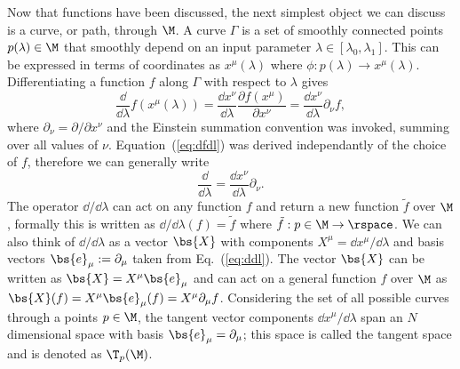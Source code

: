 Now that functions have been discussed, the next simplest object we can discuss is a curve, or path, through $\M$. A curve $\Gamma$ is a set of smoothly connected points $p(\lambda)\in \M$ that smoothly depend on an input parameter $\lambda \in [\lambda_0,\lambda_1]$. This can be expressed in terms of coordinates as $x^\mu(\lambda)$ where $\phi:p(\lambda) \rightarrow x^\mu(\lambda)$. Differentiating a function $f$ along $\Gamma$ with respect to $\lambda$ gives
\begin{equation} \label{eq:dfdl}
\frac{\dd}{\dd \lambda}f(x^\mu(\lambda)) = \frac{\dd x^\nu}{\dd \lambda}\frac{\partial f(x^\mu)}{\partial x^\nu} = \frac{\dd x^\nu}{\dd \lambda}\partial_\nu f,
\end{equation}
where $\partial_\nu = {\partial}/{\partial x^\nu}$ and the Einstein summation convention was invoked, summing over all values of $\nu$. Equation~(\ref{eq:dfdl}) was derived independantly of the choice of $f$, therefore we can generally write
\begin{equation} \label{eq:ddl}
\frac{\dd}{\dd \lambda} = \frac{\dd x^\nu}{\dd \lambda}\partial_\nu.
\end{equation}
The operator $\dd/\dd \lambda $ can act on any function $f$ and return a new function $\tilde{f}$ over $\M$, formally this is written as $\dd/\dd \lambda (f) = \tilde{f}$ where $\tilde{f}:p\in\M\rightarrow \rspace$. We can also think of $\dd/\dd \lambda$ as a vector $\bs{X}$ with components $X^\mu=\dd x^\mu / \dd \lambda$ and basis vectors $\bs{e}_\mu:=\partial_\mu$ taken from Eq.~(\ref{eq:ddl}). The vector $\bs{X}$ can be written as $\bs{X} = X^\mu \bs{e}_\mu$ and can act on a general function $f$ over $\M$ as $\bs{X}(f) = X^\mu \bs{e}_\mu(f) = X^\mu \partial_\mu f$. Considering the set of all possible curves through a points $p\in\M$, the tangent vector components $\dd x^\mu / \dd \lambda$ span an $N$ dimensional space with basis $\bs{e}_\mu = \partial_\mu$; this space is called the tangent space and is denoted as $\T_p(\M)$. 

